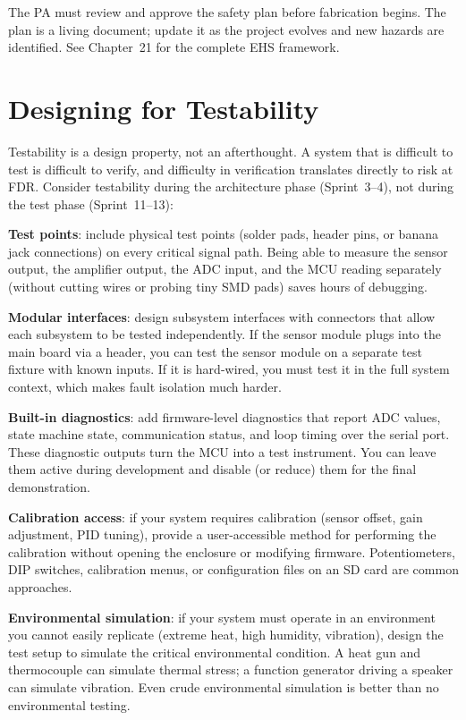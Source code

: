 The PA must review and approve the safety plan before fabrication begins. The plan is a living document; update it as the project evolves and new hazards are identified. See Chapter~21 for the complete EHS framework.

\section{Designing for Testability}
Testability is a design property, not an afterthought. A system that is difficult to test is difficult to verify, and difficulty in verification translates directly to risk at FDR. Consider testability during the architecture phase (Sprint~3--4), not during the test phase (Sprint~11--13):

\textbf{Test points}: include physical test points (solder pads, header pins, or banana jack connections) on every critical signal path. Being able to measure the sensor output, the amplifier output, the ADC input, and the MCU reading separately (without cutting wires or probing tiny SMD pads) saves hours of debugging.

\textbf{Modular interfaces}: design subsystem interfaces with connectors that allow each subsystem to be tested independently. If the sensor module plugs into the main board via a header, you can test the sensor module on a separate test fixture with known inputs. If it is hard-wired, you must test it in the full system context, which makes fault isolation much harder.

\textbf{Built-in diagnostics}: add firmware-level diagnostics that report ADC values, state machine state, communication status, and loop timing over the serial port. These diagnostic outputs turn the MCU into a test instrument. You can leave them active during development and disable (or reduce) them for the final demonstration.

\textbf{Calibration access}: if your system requires calibration (sensor offset, gain adjustment, PID tuning), provide a user-accessible method for performing the calibration without opening the enclosure or modifying firmware. Potentiometers, DIP switches, calibration menus, or configuration files on an SD card are common approaches.

\textbf{Environmental simulation}: if your system must operate in an environment you cannot easily replicate (extreme heat, high humidity, vibration), design the test setup to simulate the critical environmental condition. A heat gun and thermocouple can simulate thermal stress; a function generator driving a speaker can simulate vibration. Even crude environmental simulation is better than no environmental testing.

